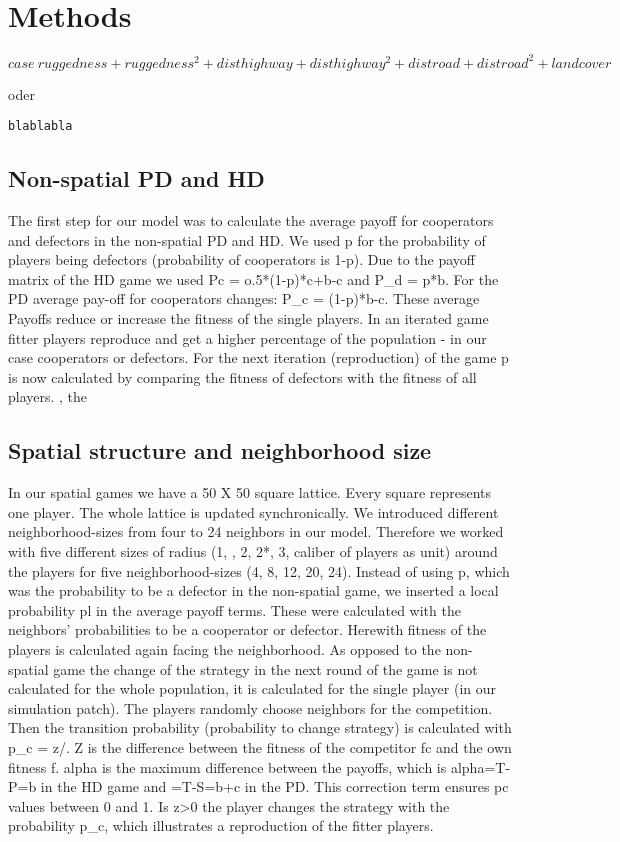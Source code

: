 \section{Methods}

\[
\displaystyle case ~ ruggedness + ruggedness^2 + disthighway + disthighway^2 + distroad + distroad^2 + landcover
\]

oder


\texttt{blablabla}




\subsection{Non-spatial PD and HD}

The first step for our model was to calculate the average payoff for cooperators and defectors in the non-spatial PD and HD. We used p for the probability of players being defectors (probability of cooperators is 1-p). Due to the payoff matrix of the HD game we used Pc = o.5*(1-p)*c+b-c and P_{d} = p*b. For the PD average pay-off for cooperators changes: P_{c} = (1-p)*b-c. These average Payoffs reduce or increase the fitness of the single players. In an iterated game fitter players reproduce and get a higher percentage of the population - in our case cooperators or defectors. For the next iteration (reproduction) of the game p is now calculated by comparing the fitness of defectors with the fitness of all players.
, the 
\subsection{Spatial structure and neighborhood size}
In our spatial games we have a 50 X 50 square lattice. Every square represents one player. The whole lattice is updated synchronically. We introduced different neighborhood-sizes from four to 24 neighbors in our model. Therefore we worked with five different sizes of radius (1, , 2, 2*, 3, caliber of players as unit) around the players for five neighborhood-sizes (4, 8, 12, 20, 24). Instead of using p, which was the probability to be a defector in the non-spatial game, we inserted a local probability pl in the average payoff terms. These were calculated with the neighbors' probabilities to be a cooperator or defector. Herewith fitness of the players is calculated again facing the neighborhood. As opposed to the non-spatial game the change of the strategy in the next round of the game is not calculated for the whole population, it is calculated for the single player (in our simulation patch). The players randomly choose neighbors for the competition. Then the transition probability (probability to change strategy) is calculated with p_{c} = z/\alpha. Z is the difference between the fitness of the competitor fc and the own fitness f. alpha is the maximum difference between the payoffs, which is alpha=T-P=b in the HD game and \alpha=T-S=b+c in the PD. This correction term ensures pc values between 0 and 1. Is z>0 the player changes the strategy with the probability p_{c}, which illustrates a reproduction of the fitter players.


